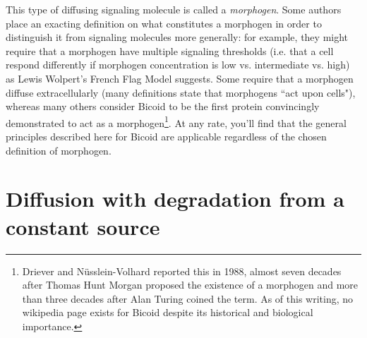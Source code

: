 \documentclass{article}
\begin{document}
This type of diffusing signaling molecule is called a \textit{morphogen}. Some authors place an exacting definition on what constitutes a morphogen in order to distinguish it from signaling molecules more generally: for example, they might require that a morphogen have multiple signaling thresholds (i.e. that a cell respond differently if morphogen concentration is low vs. intermediate vs. high) as Lewis Wolpert's French Flag Model suggests. Some require that a morphogen diffuse extracellularly (many definitions state that morphogens ``act upon cells"), whereas many others consider Bicoid to be the first protein convincingly demonstrated to act as a morphogen\footnote{Driever and N\"{u}sslein-Volhard reported this in 1988, almost seven decades after Thomas Hunt Morgan proposed the existence of a morphogen and more than three decades after Alan Turing coined the term. As of this writing, no wikipedia page exists for Bicoid despite its historical and biological importance.}. At any rate, you'll find that the general principles described here for Bicoid are applicable regardless of the chosen definition of morphogen.

\section*{Diffusion with degradation from a constant source}
\end{document}
